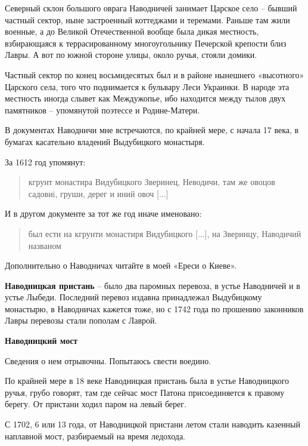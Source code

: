 Северный склон большого оврага Наводничей занимает Царское село – бывший частный сектор, ныне застроенный коттеджами и теремами. Раньше там жили военные, а до Великой Отечественной вообще была дикая местность, взбирающаяся к террасированному многоугольнику Печерской крепости близ Лавры. А вот по южной стороне улицы, около ручья, стояли домики.

Частный сектор по конец восьмидесятых был и в районе нынешнего «высотного» Царского села, того что поднимается к бульвару Леси Украинки. В народе эта местность иногда слывет как Междужопье, ибо находится между тылов двух памятников – упомянутой поэтессе и Родине-Матери.

В документах Наводничи мне встречаются, по крайней мере, с начала 17 века, в бумагах касательно владений Выдубицкого монастыря. 

За 1612 год упомянут:

\begin{quotation}
\noindent кгрунт монастира Видубицкого Зверинец, Неводичи, там же овоцов садовиi, груши, дерег и иний овоч [...]  
\end{quotation}

И в другом документе за тот же год иначе именовано:

\begin{quotation}
\noindent был ести на кгрунти монастиря Видубицкого [...], на Зверинцу, Наводичий названом\end{quotation}

Дополнительно о Наводничах читайте в моей «Ереси о Киеве».\\

\medskip

\textbf{Наводницкая пристань} – было два паромных перевоза, в устье Наводничей и в устье Лыбеди. Последний перевоз издавна принадлежал Выдубицкому монастырю, в Наводничах кажется тоже, но с 1742 года по прошению законников Лавры перевозы стали пополам с Лаврой.\\

\medskip

\textbf{Наводницкий мост} 

Сведения о нем отрывочны. Попытаюсь свести воедино.

По крайней мере в 18 веке Наводницкая пристань была в устье Наводницкого ручья, грубо говорят, там где сейчас мост Патона присоединяется к правому берегу. От пристани ходил паром на левый берег.

С 1702, 6 или 13 года, от Наводницкой пристани летом стали наводить казенный наплавной мост, разбираемый на время ледохода. 

